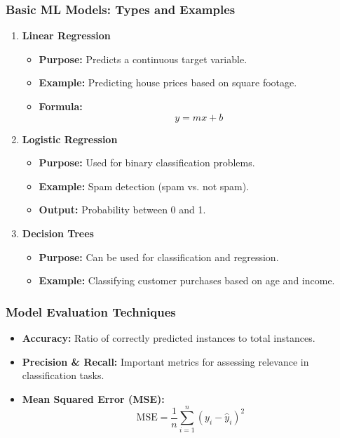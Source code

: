 \documentclass[aspectratio=169]{beamer}
\begin{document}
\begin{frame}[fragile]
    \frametitle{Basic ML Models: Types and Examples}
    \begin{enumerate}
        \item \textbf{Linear Regression}
        \begin{itemize}
            \item \textbf{Purpose:} Predicts a continuous target variable.
            \item \textbf{Example:} Predicting house prices based on square footage.
            \item \textbf{Formula:} 
            \begin{equation}
                y = mx + b
            \end{equation}
        \end{itemize}
        
        \item \textbf{Logistic Regression}
        \begin{itemize}
            \item \textbf{Purpose:} Used for binary classification problems.
            \item \textbf{Example:} Spam detection (spam vs. not spam).
            \item \textbf{Output:} Probability between 0 and 1.
        \end{itemize}
        
        \item \textbf{Decision Trees}
        \begin{itemize}
            \item \textbf{Purpose:} Can be used for classification and regression.
            \item \textbf{Example:} Classifying customer purchases based on age and income.
        \end{itemize}
    \end{enumerate}
\end{frame}

\begin{frame}[fragile]
    \frametitle{Model Evaluation Techniques}
    \begin{itemize}
        \item \textbf{Accuracy:} Ratio of correctly predicted instances to total instances.
        \item \textbf{Precision \& Recall:} Important metrics for assessing relevance in classification tasks.
        \item \textbf{Mean Squared Error (MSE):} 
        \begin{equation}
            \text{MSE} = \frac{1}{n} \sum_{i=1}^{n}(y_i - \hat{y}_i)^2
        \end{equation}
    \end{itemize}
\end{frame}
\end{document}
